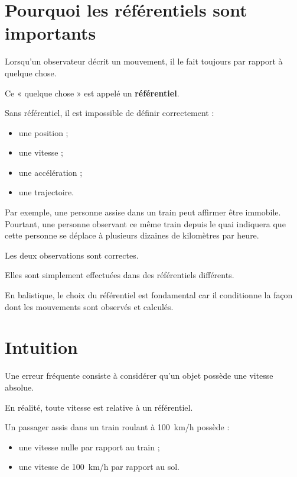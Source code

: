 
\section{Pourquoi les référentiels sont importants}

Lorsqu'un observateur décrit un mouvement, il le fait toujours par rapport à
quelque chose.

Ce « quelque chose » est appelé un \textbf{référentiel}.

Sans référentiel, il est impossible de définir correctement :

\begin{itemize}
    \item une position ;
    \item une vitesse ;
    \item une accélération ;
    \item une trajectoire.
\end{itemize}

Par exemple, une personne assise dans un train peut affirmer être immobile.
Pourtant, une personne observant ce même train depuis le quai indiquera que
cette personne se déplace à plusieurs dizaines de kilomètres par heure.

Les deux observations sont correctes.

Elles sont simplement effectuées dans des référentiels différents.

En balistique, le choix du référentiel est fondamental car il conditionne la
façon dont les mouvements sont observés et calculés.

\section{Intuition}

Une erreur fréquente consiste à considérer qu'un objet possède une vitesse
absolue.

En réalité, toute vitesse est relative à un référentiel.

Un passager assis dans un train roulant à 100~km/h possède :

\begin{itemize}
    \item une vitesse nulle par rapport au train ;
    \item une vitesse de 100~km/h par rapport au sol.
\end{itemize}

